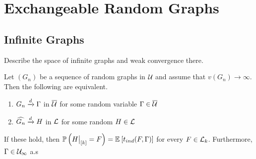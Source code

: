 \documentclass{article}
\begin{document}
\section{Exchangeable Random Graphs}
\subsection{Infinite Graphs}
Describe the space of infinite graphs and weak convergence there.

\begin{theorem}
   Let $\left( G_n \right)$ be a sequence of random graphs in $\Ug$ and assume that $v(G_n) \to \infty$. Then the following are equivalent.
  \begin{enumerate}
    \item $G_n \xrightarrow{d} \Gamma$ in $\Ug*$ for some random variable $\Gamma \in \Ug*$
    \item $\widehat{G_n} \xrightarrow{d} H$ in $\Lg$ for some random $H \in \Lg$
  \end{enumerate}
  If these hold, then $\Pb{\restr{H}{[k]} = F} = \Ex{t_{ind}(F, \Gamma)}$ for every $F \in \Lg[k]$. Furthermore, $\Gamma \in \Ug[\infty]$ a.s
   
  \label{thm:conv-to-infinite-graphs}
\end{theorem}

\printbibliography
\end{document}
